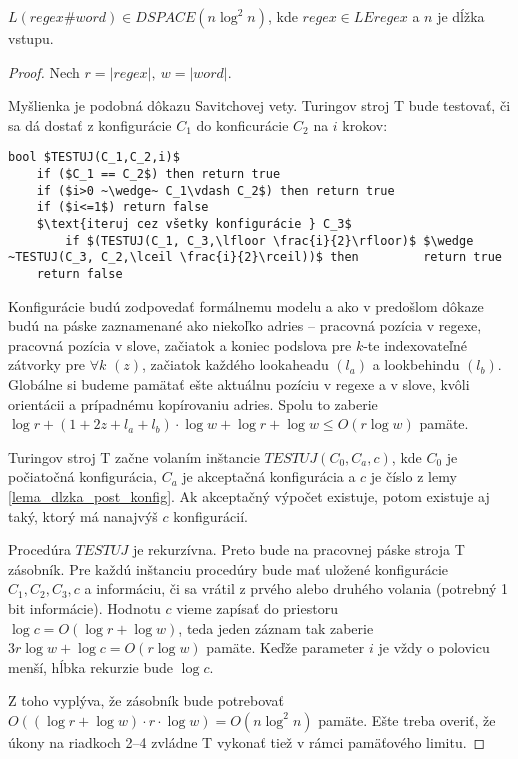 \documentclass{svk_long_sk}
\def\le{LEregex}
\begin{document}
\begin{theorem}\label{regexword_dspace}
$L(regex\#word) \in DSPACE(n \log^2 n)$, kde $regex \in \le$ a $n$ je dĺžka vstupu.
\end{theorem}
\begin{proof} 
Nech $r=|regex|,~w=|word|$.

Myšlienka je podobná dôkazu Savitchovej vety\cite{Savitch_skripta}. Turingov stroj T bude testovať, či sa dá dostať z konfigurácie $C_1$ do konficurácie $C_2$ na $i$ krokov:
\begin{lstlisting}[mathescape]
bool $TESTUJ(C_1,C_2,i)$
	if ($C_1 == C_2$) then return true
	if ($i>0 ~\wedge~ C_1\vdash C_2$) then return true
	if ($i<=1$) return false
	$\text{iteruj cez všetky konfigurácie } C_3$
		if $(TESTUJ(C_1, C_3,\lfloor \frac{i}{2}\rfloor)$ $\wedge ~TESTUJ(C_3, C_2,\lceil \frac{i}{2}\rceil))$ then 		return true
	return false
\end{lstlisting}
Konfigurácie budú zodpovedať formálnemu modelu a ako v predošlom dôkaze budú na páske zaznamenané ako niekoľko adries -- pracovná pozícia v regexe, pracovná pozícia v slove, začiatok a koniec podslova pre $k$-te indexovateľné zátvorky pre $\forall k$ $(z)$, začiatok každého lookaheadu $(l_a)$ a lookbehindu $(l_b)$. Globálne si budeme pamätať ešte aktuálnu pozíciu v regexe a v slove, kvôli orientácii a prípadnému kopírovaniu adries. Spolu to zaberie $\log r+(1+2z+l_a+l_b)\cdot \log w + \log r+\log w \leq O(r\log w)$ pamäte.

Turingov stroj T začne volaním inštancie $TESTUJ(C_0,C_a,c)$, kde $C_0$ je počiatočná konfigurácia, $C_a$ je akceptačná konfigurácia a $c$ je číslo z lemy \ref{lema_dlzka_post_konfig}. Ak akceptačný výpočet existuje, potom existuje aj taký, ktorý má nanajvýš $c$ konfigurácií.

Procedúra $TESTUJ$ je rekurzívna. Preto bude na pracovnej páske stroja T zásobník. Pre každú inštanciu procedúry bude mať uložené konfigurácie $C_1, C_2, C_3, c$ a informáciu, či sa vrátil z prvého alebo druhého volania (potrebný 1 bit informácie). Hodnotu $c$ vieme zapísať do priestoru $\log c = O(\log r + \log w)$, teda jeden záznam tak zaberie $3r\log w + \log c = O(r\log w)$ pamäte. Keďže parameter $i$ je vždy o polovicu menší, hĺbka rekurzie bude $\log c$.

Z toho vyplýva, že zásobník bude potrebovať $O((\log r + \log w)\cdot r\cdot \log w) = O(n\log^2n)$ pamäte. Ešte treba overiť, že úkony na riadkoch 2--4 zvládne T vykonať tiež v rámci pamäťového limitu.


\end{proof}
\end{document}
